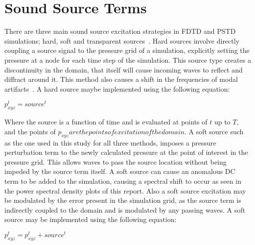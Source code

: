 \section{Sound Source Terms}
There are three main sound source excitation strategies in FDTD and PSTD simulations; hard, soft and transparent sources~\cite{Murphy2014}. Hard sources involve directly coupling a source signal to the pressure grid of a simulation, explicitly setting the pressure at a node for each time step of the simulation. This source type creates a discontinuity in the domain, that itself will cause incoming waves to reflect and diffract around it. This method also causes a shift in the frequencies of modal artifacts~\cite{Murphy2014}. A hard source maybe implemented using the following equation:\\
\begin{center}
$p_{xyz}^{t} = source^{t} $
\end{center}
Where the source is a function of time and is evaluated at points of $t$ up to $T$, and the points of $p_{xyz} are the points of excitation of the domain$.
A soft source such as the one used in this study for all three methods, imposes a pressure perturbation term to the newly calculated pressure at the point of interest in the pressure grid. This allows waves to pass the source location without being impeded by the source term itself. A soft source can cause an anomalous DC term to be added to the simulation, causing a spectral shift to occur as seen in the power spectral density plots of this report. Also a soft source excitation may be modulated by the error present in the simulation grid, as the source term is indirectly coupled to the domain and is modulated by any passing waves. A soft source may be implemented using the following equation:\\
\begin{center}
$p_{xyz}^{t} = p_{xyz}^{t} + source^{t}$
\end{center}
